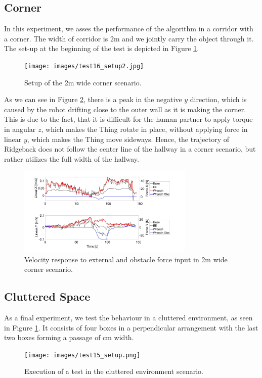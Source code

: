 \subsection{Corner}
In this experiment, we asses the performance of the algorithm in a corridor with a corner. The width of corridor is \unit{2}{m} and we jointly carry the object through it. The set-up at the beginning of the test is depicted in Figure \ref{pics:test16_setup}.

\begin{figure}[h]
   \centering
   \texttt{[image: images/test16\_setup2.jpg]}
   \caption{Setup of the \unit{2}{m} wide corner scenario.}
   \label{pics:test16_setup}
\end{figure}

As we can see in Figure \ref{pics:test16}, there is a peak in the negative $y$ direction, which is caused by the robot drifting close to the outer wall as it is making the corner. This is due to the fact, that it is difficult for the human partner to apply torque in angular $z$, which makes the Thing rotate in place, without applying force in linear $y$, which makes the Thing move sideways. Hence, the trajectory of Ridgeback does not follow the center line of the hallway in a corner scenario, but rather utilizes the full width of the hallway.

\begin{figure}
   \centering
   \includegraphics[width=0.75\textwidth]{images/test16.jpg}
   \caption{Velocity response to external and obstacle force input in \unit{2}{m} wide corner scenario.}
   \label{pics:test16}
\end{figure}

\subsection{Cluttered Space}
As a final experiment, we test the behaviour in a cluttered environment, as seen in Figure \ref{pics:test16_setup}. It consists of four boxes in a perpendicular arrangement with the last two boxes forming a passage of \unit[120]{cm} width.
\begin{figure}
   \centering
   \texttt{[image: images/test15\_setup.png]}
   \caption{Execution of a test in the cluttered environment scenario.}
   \label{pics:test15_setup}
\end{figure}

